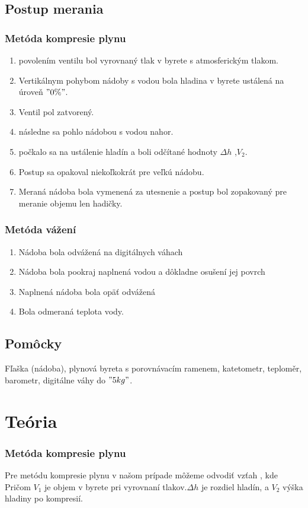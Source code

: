 \documentclass[a4paper,10pt]{article}
\begin{document}
\subsection{Postup merania}
\subsubsection{Metóda kompresie plynu}
\begin{enumerate}
\item povolením ventilu bol vyrovnaný tlak v byrete s atmosferickým tlakom.
\item Vertikálnym pohybom nádoby s vodou bola hladina v byrete ustálená na úroveň $"0 \%"$.
\item Ventil pol zatvorený.
\item následne sa pohlo nádobou s vodou nahor.
\item počkalo sa na ustálenie hladín a boli odčítané hodnoty $\Delta h$ ,$V_2$.
\item Postup sa opakoval niekoľkokrát pre veľkú nádobu.
\item Meraná nádoba bola vymenená za utesnenie a postup bol zopakovaný pre meranie objemu len hadičky.
\end{enumerate}


\subsubsection{Metóda vážení}
\begin{enumerate}
\item Nádoba bola odvážená na digitálnych váhach 
\item Nádoba bola pookraj naplnená vodou a dôkladne osušení jej povrch
\item Naplnená nádoba bola opäť odvážená
\item Bola odmeraná teplota vody.
\end{enumerate}

\subsection{Pomôcky}
Fľaška (nádoba), plynová byreta s porovnávacím ramenem, katetometr,
teploměr, barometr, digitálne váhy do $"5 kg"$.

\section{Teória}

\subsubsection{Metóda kompresie plynu}
Pre metódu kompresie plynu v našom prípade môžeme odvodiť vzťah
, kde 
Pričom $V_1$ je objem v byrete pri vyrovnaní tlakov.$\Delta h$ je rozdiel hladín, a $V_2$ výška hladiny po kompresií.
\end{document}
